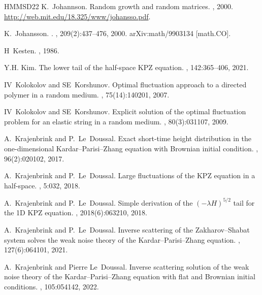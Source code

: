 \documentclass[reqno,11pt]{amsart}
\numberwithin{equation}{section}
\theoremstyle{definition}
\begin{document}
\begin{thebibliography}{HMMSD22}
K.~Johannson.
\newblock Random growth and random matrices.
, 2000.
\newblock \url{http://web.mit.edu/18.325/www/johansso.pdf}.

K.~Johansson.
.
, 209(2):437--476, 2000.
\newblock arXiv:math/9903134 [math.CO].

H~Kesten.
, 1986.

Y.H. Kim.
\newblock The lower tail of the half-space {KPZ} equation.
, 142:365--406, 2021.

IV~Kolokolov and SE~Korshunov.
\newblock Optimal fluctuation approach to a directed polymer in a random medium.
, 75(14):140201, 2007.

IV~Kolokolov and SE~Korshunov.
\newblock Explicit solution of the optimal fluctuation problem for an elastic string in a random medium.
, 80(3):031107, 2009.

A.~Krajenbrink and P.~Le~Doussal.
\newblock Exact short-time height distribution in the one-dimensional {K}ardar{--P}arisi{--Z}hang equation with {B}rownian initial condition.
, 96(2):020102, 2017.

A.~Krajenbrink and P.~Le~Doussal.
\newblock Large fluctuations of the {KPZ} equation in a half-space.
, 5:032, 2018.

A.~Krajenbrink and P.~Le~Doussal.
\newblock Simple derivation of the {$(-\lambda H)^{5/2}$} tail for the 1{D} {KPZ} equation.
, 2018(6):063210, 2018.

A.~Krajenbrink and P.~Le~Doussal.
\newblock Inverse scattering of the {Z}akharov{--S}habat system solves the weak noise theory of the {K}ardar{--P}arisi{--Z}hang equation.
, 127(6):064101, 2021.

A.~Krajenbrink and Pierre Le~Doussal.
\newblock Inverse scattering solution of the weak noise theory of the {K}ardar{--P}arisi{--Z}hang equation with flat and {B}rownian initial conditions.
, 105:054142, 2022.


\end{thebibliography}
\end{document}
